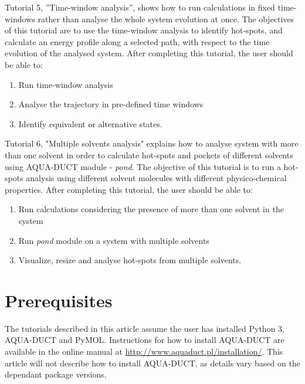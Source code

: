 \documentclass[9pt,tutorial]{livecoms}
\begin{document}
Tutorial 5, ”Time-window analysis”, shows how to run calculations in fixed time-windows rather than analyse the whole system evolution at once. The objectives of this tutorial are to use the time-window analysis to identify hot-spots, and calculate an energy profile along a selected path, with respect to the time evolution of the analysed system. After completing this tutorial, the user should be able to:
\begin{enumerate}
  \item Run time-window analysis
  \item Analyse the trajectory in pre-defined time windows 
  \item Identify equivalent or alternative states. 
\end{enumerate}

Tutorial 6, "Multiple solvents analysis" explains how to analyse system with more than one solvent in order to calculate hot-spots and pockets of different solvents using AQUA-DUCT module - \textit{pond}. The objective of this tutorial is to run a hot-spots analysis using different solvent molecules with different physico-chemical properties. After completing this tutorial, the user should be able to:
\begin{enumerate}
  \item Run calculations considering the presence of more than one solvent in the system
  \item Run \textit{pond} module on a system with multiple solvents
  \item Visualize, resize and analyse hot-spots from multiple solvents.
\end{enumerate}

\section{Prerequisites}

The tutorials described in this article assume the user has installed Python 3, AQUA-DUCT and PyMOL. Instructions for how to install AQUA-DUCT are available in the online manual at \url{http://www.aquaduct.pl/installation/}. This article will not describe how to install AQUA-DUCT, as details vary based on the dependant package versions.
\end{document}
